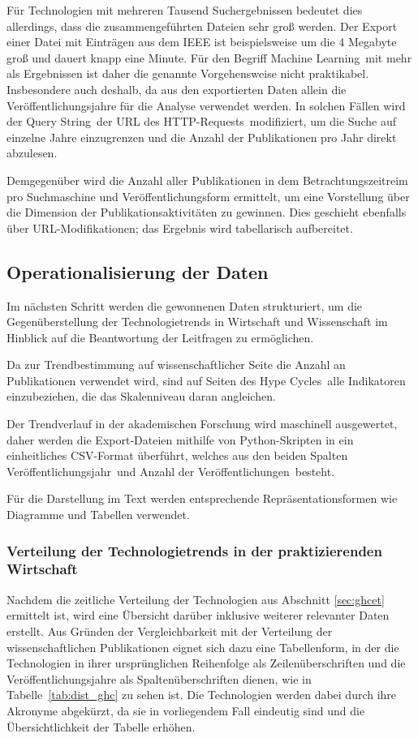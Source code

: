 Für Technologien mit mehreren Tausend Such\-ergebnissen bedeutet dies allerdings, dass die zusammengeführten Dateien sehr groß werden. Der Export einer Datei mit  Einträgen aus dem \ac{IEEE} ist beispielsweise um die 4 Megabyte groß und dauert knapp eine Minute. Für den Begriff \glqq Machine Learning\grqq~mit mehr als  Ergebnissen ist daher die genannte Vorgehensweise nicht praktikabel. Insbesondere auch deshalb, da aus den exportierten Daten allein die Veröffentlichungsjahre für die Analyse verwendet werden. In solchen Fällen wird der \glqq Query String\grqq~der \ac{URL} des \glqq \acs{HTTP}-Requests\grqq~modifiziert, um die Suche auf einzelne Jahre einzugrenzen und die Anzahl der Publikationen pro Jahr direkt abzulesen.

Demgegenüber wird die Anzahl aller Publikationen in dem Betrachtungszeitreim pro Suchmaschine und Veröffentlichungsform ermittelt, um eine Vorstellung über die Dimension der Publikations\-aktivitäten zu gewinnen. Dies geschieht ebenfalls über \ac{URL}-Modifikationen; das Ergebnis wird tabellarisch aufbereitet.

\subsection{Operationalisierung der Daten}
Im nächsten Schritt werden die gewonnenen Daten strukturiert, um die Gegenüberstellung der Technologietrends in Wirtschaft und Wissenschaft im Hinblick auf die Beantwortung der Leitfragen zu ermöglichen.

Da zur Trendbestimmung auf wissenschaftlicher Seite die Anzahl an Publikationen verwendet wird, sind auf Seiten des \glqq Hype Cycles\grqq~alle Indikatoren einzubeziehen, die das Skalenniveau daran angleichen.

Der Trendverlauf in der akademischen Forschung wird maschinell ausgewertet, daher werden die Export-Dateien mithilfe von Python-Skripten in ein einheitliches \acs{CSV}-Format überführt, welches aus den beiden Spalten \glqq Veröffentlichungsjahr\grqq~und \glqq Anzahl der Veröffentlichungen\grqq~besteht.

Für die Darstellung im Text werden entsprechende Repräsentationsformen wie Diagramme und Tabellen verwendet.

\subsubsection{Verteilung der Technologietrends in der praktizierenden Wirtschaft}
Nachdem die zeitliche Verteilung der Technologien aus Abschnitt \ref{sec:ghcet} ermittelt ist, wird eine Übersicht darüber inklusive weiterer relevanter Daten erstellt. Aus Gründen der Vergleichbarkeit mit der Verteilung der wissenschaftlichen Publikationen eignet sich dazu eine Tabellenform, in der die Technologien in ihrer ursprünglichen Reihenfolge als Zeilenüberschriften und die Veröffentlichungsjahre als Spaltenüberschriften dienen, wie in Tabelle~\ref{tab:dist_ghc} zu sehen ist. Die Technologien werden dabei durch ihre Akronyme abgekürzt, da sie in vorliegendem Fall eindeutig sind und die Übersichtlichkeit der Tabelle erhöhen.

